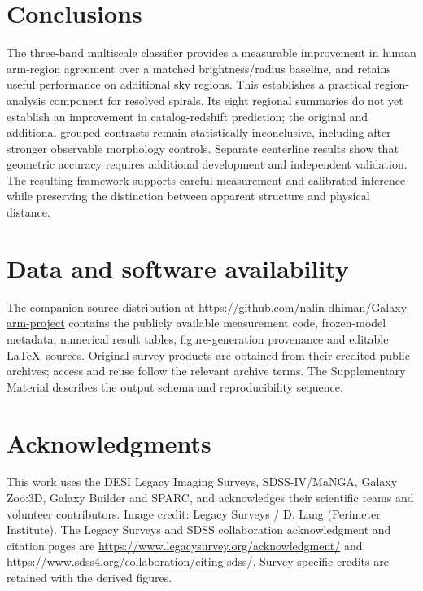 \documentclass[11pt]{article}
\begin{document}
\section{Conclusions}
The three-band multiscale classifier provides a measurable improvement in
human arm-region agreement over a matched brightness/radius baseline, and
retains useful performance on additional sky regions. This establishes a
practical region-analysis component for resolved spirals. Its eight regional
summaries do not yet establish an improvement in catalog-redshift prediction;
the original and additional grouped contrasts remain statistically inconclusive,
including after stronger observable morphology controls. Separate centerline
results show that geometric accuracy requires additional development and
independent validation. The resulting framework supports careful measurement
and calibrated inference while preserving the distinction between apparent
structure and physical distance.

\section*{Data and software availability}
The companion source distribution at
\url{https://github.com/nalin-dhiman/Galaxy-arm-project}
contains the publicly available measurement code, frozen-model
metadata, numerical result tables, figure-generation provenance and editable
\LaTeX\ sources. Original survey products are obtained from their credited
public archives; access and reuse follow the relevant archive terms. The
Supplementary Material describes the output schema and reproducibility sequence.

\section*{Acknowledgments}
This work uses the DESI Legacy Imaging Surveys, SDSS-IV/MaNGA, Galaxy Zoo:3D,
Galaxy Builder and SPARC, and acknowledges their scientific teams and volunteer
contributors. Image credit: Legacy Surveys / D. Lang (Perimeter Institute).
The Legacy Surveys and SDSS collaboration acknowledgment and citation pages
are \url{https://www.legacysurvey.org/acknowledgment/} and
\url{https://www.sdss4.org/collaboration/citing-sdss/}. Survey-specific credits
are retained with the derived figures.



\end{document}
